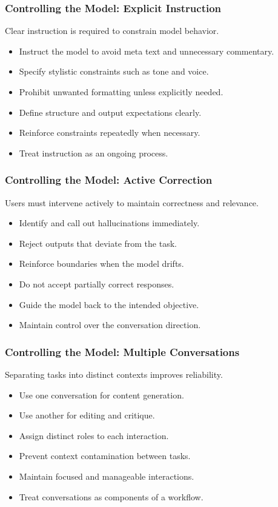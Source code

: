 \documentclass{beamer}
\begin{document}
\frame
{
   \frametitle{Controlling the Model: Explicit Instruction}

    Clear instruction is required to constrain model behavior.

    \begin{itemize}
        \item Instruct the model to avoid meta text and unnecessary commentary.
        \item Specify stylistic constraints such as tone and voice.
        \item Prohibit unwanted formatting unless explicitly needed.
        \item Define structure and output expectations clearly.
        \item Reinforce constraints repeatedly when necessary.
        \item Treat instruction as an ongoing process.
    \end{itemize}
}

\frame
{
   \frametitle{Controlling the Model: Active Correction}

    Users must intervene actively to maintain correctness and relevance.

    \begin{itemize}
        \item Identify and call out hallucinations immediately.
        \item Reject outputs that deviate from the task.
        \item Reinforce boundaries when the model drifts.
        \item Do not accept partially correct responses.
        \item Guide the model back to the intended objective.
        \item Maintain control over the conversation direction.
    \end{itemize}
}

\frame
{
   \frametitle{Controlling the Model: Multiple Conversations}

    Separating tasks into distinct contexts improves reliability.

    \begin{itemize}
        \item Use one conversation for content generation.
        \item Use another for editing and critique.
        \item Assign distinct roles to each interaction.
        \item Prevent context contamination between tasks.
        \item Maintain focused and manageable interactions.
        \item Treat conversations as components of a workflow.
    \end{itemize}
}
\end{document}
